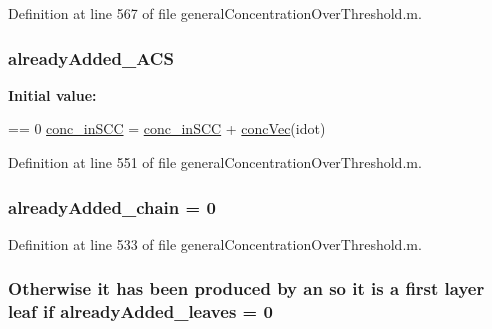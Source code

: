 Definition at line 567 of file general\+Concentration\+Over\+Threshold.\+m.

\hypertarget{a00028_a77c2cda04a3103708011753a77dceda3}{
\subsubsection[{already\+Added\+\_\+\+A\+C\+S}]{\setlength{\rightskip}{0pt plus 5cm}already\+Added\+\_\+\+A\+C\+S}}\label{a00028_a77c2cda04a3103708011753a77dceda3}
{\bfseries Initial value\+:}
\begin{DoxyCode}
== 0 %
                                                \hyperlink{a00028_a2ac2f79c8327273bba427ba3e8d2cfbe}{conc\_inSCC} = 
      \hyperlink{a00028_a2ac2f79c8327273bba427ba3e8d2cfbe}{conc\_inSCC} + \hyperlink{a00028_a5cb5865443d8f156213280c070385e0d}{concVec}(idot)
\end{DoxyCode}


Definition at line 551 of file general\+Concentration\+Over\+Threshold.\+m.

\hypertarget{a00028_a1ddec545d7ccb86836f79e7f7e9ecb55}{
\subsubsection[{already\+Added\+\_\+chain}]{ already\+Added\+\_\+chain = 0}}\label{a00028_a1ddec545d7ccb86836f79e7f7e9ecb55}


Definition at line 533 of file general\+Concentration\+Over\+Threshold.\+m.

\hypertarget{a00028_aabbdc56dad7f3314f69a712de710352c}{
\subsubsection[{already\+Added\+\_\+leaves}]{ Otherwise it has been produced by an so it is {\bf a} first layer leaf {\bf if} already\+Added\+\_\+leaves = 0}}\label{a00028_aabbdc56dad7f3314f69a712de710352c}


